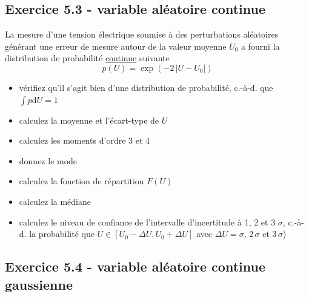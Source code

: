 \documentclass[main.tex]{subfiles}
\begin{document}
\subsection*{Exercice 5.3 - variable aléatoire continue}

La mesure d'une tension électrique soumise à des perturbations aléatoires générant une erreur de mesure autour de la valeur moyenne $U_0$ a fourni la distribution de probabilité \underline{continue} suivante
$$
    p(U)=\exp{(-2\,|U-U_0|)}
$$
\begin{itemize}
    \item vérifiez qu'il s'agit bien d'une distribution de probabilité, c.-à-d. que $\int p\text{d}U=1$
    \item calculez la moyenne et l'écart-type de $U$
    \item calculez les moments d'ordre 3 et 4
    \item donnez le mode
    \item calculez la fonction de répartition $F(U)$
    \item calculez la médiane
    \item calculez le niveau de confiance de l'intervalle d'incertitude à 1, 2 et 3 $\sigma$, c.-à-d. la probabilité que $U\in[U_0-\Delta U,U_0+\Delta U]$ avec $\Delta U=\sigma$, $2\,\sigma$ et $3\,\sigma$)
\end{itemize}

\subsection*{Exercice 5.4 - variable aléatoire continue gaussienne}
\end{document}
